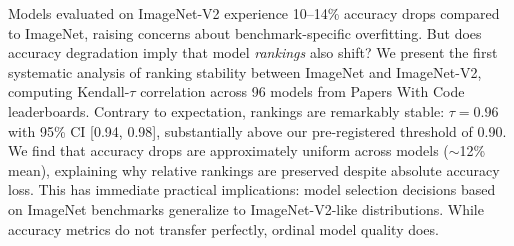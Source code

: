 Models evaluated on ImageNet-V2 experience 10--14\% accuracy drops compared to ImageNet, raising concerns about benchmark-specific overfitting. But does accuracy degradation imply that model \emph{rankings} also shift? We present the first systematic analysis of ranking stability between ImageNet and ImageNet-V2, computing Kendall-$\tau$ correlation across 96 models from Papers With Code leaderboards. Contrary to expectation, rankings are remarkably stable: $\tau = 0.96$ with 95\% CI [0.94, 0.98], substantially above our pre-registered threshold of 0.90. We find that accuracy drops are approximately uniform across models ($\sim$12\% mean), explaining why relative rankings are preserved despite absolute accuracy loss. This has immediate practical implications: model selection decisions based on ImageNet benchmarks generalize to ImageNet-V2-like distributions. While accuracy metrics do not transfer perfectly, ordinal model quality does.
